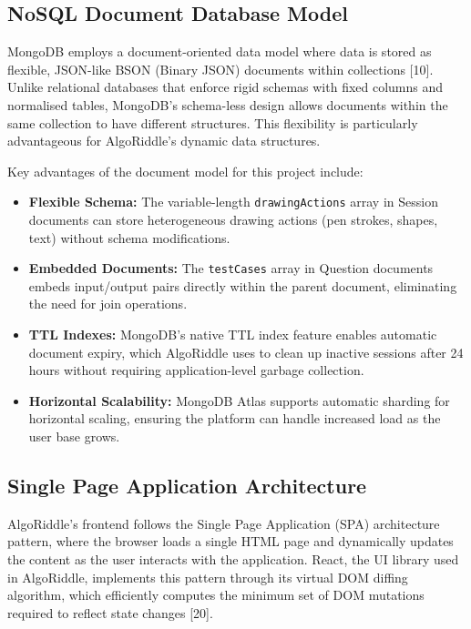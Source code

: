 \subsection{NoSQL Document Database Model}

MongoDB employs a document-oriented data model where data is stored as flexible, JSON-like BSON (Binary JSON) documents within collections [10]. Unlike relational databases that enforce rigid schemas with fixed columns and normalised tables, MongoDB's schema-less design allows documents within the same collection to have different structures. This flexibility is particularly advantageous for AlgoRiddle's dynamic data structures.

Key advantages of the document model for this project include:

\begin{itemize}
    \item \textbf{Flexible Schema:} The variable-length \texttt{drawingActions} array in Session documents can store heterogeneous drawing actions (pen strokes, shapes, text) without schema modifications.
    \item \textbf{Embedded Documents:} The \texttt{testCases} array in Question documents embeds input/output pairs directly within the parent document, eliminating the need for join operations.
    \item \textbf{TTL Indexes:} MongoDB's native TTL index feature enables automatic document expiry, which AlgoRiddle uses to clean up inactive sessions after 24 hours without requiring application-level garbage collection.
    \item \textbf{Horizontal Scalability:} MongoDB Atlas supports automatic sharding for horizontal scaling, ensuring the platform can handle increased load as the user base grows.
\end{itemize}

\subsection{Single Page Application Architecture}

AlgoRiddle's frontend follows the Single Page Application (SPA) architecture pattern, where the browser loads a single HTML page and dynamically updates the content as the user interacts with the application. React, the UI library used in AlgoRiddle, implements this pattern through its virtual DOM diffing algorithm, which efficiently computes the minimum set of DOM mutations required to reflect state changes [20].

